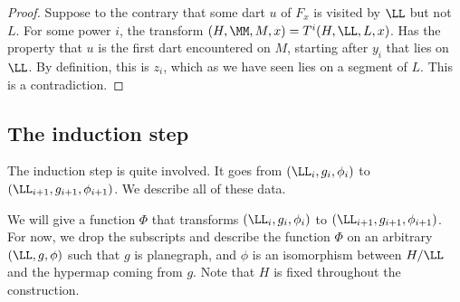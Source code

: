 \begin{proof}  Suppose to the contrary that some dart $u$ of $F_x$ is
visited by $\LL$ but not $L$.  For some power $i$, the transform
$(H,\MM,M,x) = T^i(H,\LL,L,x)$. Has the property that $u$ is
the first dart encountered on $M$, starting after $y_i$ that lies on $\LL$.
By definition, this is $z_i$, which as we have seen lies on a segment of
$L$.  This is a contradiction.
\end{proof}








\subsection{The induction step}

The induction step is quite involved.  It goes from
$(\LL_i,g_i,\phi_i)$ to $(\LL_{i+1},g_{i+1},\phi_{i+1})$.
We describe all of these data.

We will give a function $\Phi$ that transforms $(\LL_i,g_i,\phi_i)$ to
$(\LL_{i+1},g_{i+1},\phi_{i+1})$.  For now, we drop the subscripts and
describe the function $\Phi$ on an arbitrary $(\LL,g,\phi)$ such that
$g$ is planegraph, and $\phi$ is an isomorphism between $H/\LL$ and
the hypermap coming from $g$.  Note that $H$ is fixed throughout the
construction.

